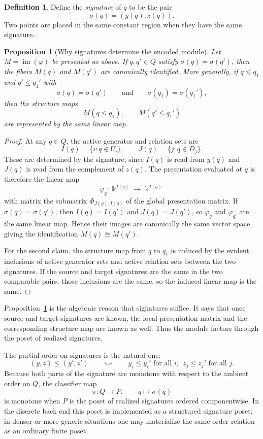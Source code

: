 \documentclass[11pt]{article}
\newcommand{\kk}{\Bbbk}
\newtheorem{proposition}[theorem]{Proposition}
\theoremstyle{definition}
\newtheorem{defn}[theorem]{Definition}
\theoremstyle{remark}
\begin{document}
\begin{defn}
	Define the \emph{signature} of $q$ to be the pair
	\[
	\sigma(q)=(y(q),z(q)).
	\]
	Two points are placed in the same constant region when they have the same signature.
\end{defn}

\begin{proposition}[Why signatures determine the encoded module]
	\label{prop:signature-factorization}
	Let $M=\operatorname{im}(\varphi)$ be presented as above.  If $q,q'\in Q$ satisfy
	\(\sigma(q)=\sigma(q')\), then the fibers $M(q)$ and $M(q')$ are canonically identified.  More generally, if $q\leq q_1$ and $q'\leq q_1'$ with
	\[
	\sigma(q)=\sigma(q')
	\qquad\text{and}\qquad
	\sigma(q_1)=\sigma(q_1'),
	\]
	then the structure maps
	\[
	M(q\leq q_1),\qquad M(q'\leq q_1')
	\]
	are represented by the same linear map.
\end{proposition}

\begin{proof}
	At any $q\in Q$, the active generator and relation sets are
	\[
	I(q)=\{i:q\in U_i\},
	\qquad
	J(q)=\{j:q\in D_j\}.
	\]
	These are determined by the signature, since $I(q)$ is read from $y(q)$ and $J(q)$ is read from the complement of $z(q)$.  The presentation evaluated at $q$ is therefore the linear map
	\[
	\varphi_q\colon \kk^{I(q)}\longrightarrow \kk^{J(q)}
	\]
	with matrix the submatrix $\Phi_{J(q),I(q)}$ of the global presentation matrix.  If $\sigma(q)=\sigma(q')$, then $I(q)=I(q')$ and $J(q)=J(q')$, so $\varphi_q$ and $\varphi_{q'}$ are the same linear map.  Hence their images are canonically the same vector space, giving the identification $M(q)\cong M(q')$.
	
	For the second claim, the structure map from $q$ to $q_1$ is induced by the evident inclusions of active generator sets and active relation sets between the two signatures.  If the source and target signatures are the same in the two comparable pairs, those inclusions are the same, so the induced linear map is the same.
\end{proof}

Proposition~\ref{prop:signature-factorization} is the algebraic reason that signatures suffice.  It says that once source and target signatures are known, the local presentation matrix and the corresponding structure map are known as well.  Thus the module factors through the poset of realized signatures.

The partial order on signatures is the natural one:
\[
(y,z)\leq (y',z')
\qquad\Longleftrightarrow\qquad
y_i\leq y_i'\text{ for all }i,
\ \
z_j\leq z_j'\text{ for all }j.
\]
Because both parts of the signature are monotone with respect to the ambient order on $Q$, the classifier map
\[
\pi\colon Q\longrightarrow P,
\qquad
q\longmapsto \sigma(q)
\]
is monotone when $P$ is the poset of realized signatures ordered componentwise.  In the discrete back end this poset is implemented as a structured signature poset; in denser or more generic situations one may materialize the same order relation as an ordinary finite poset.
\end{document}
